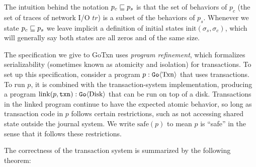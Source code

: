 The intuition behind the notation $p_{c} \sqsubseteq p_{s}$ is that the set of
behaviors of $p_{c}$ (the set of traces of network I/O $\textit{tr}$) is a subset of the
behaviors of $p_{s}$. Whenever we state $p_{c} \sqsubseteq p_{s}$ we leave implicit
a definition of initial states $\mathrm{init}(\sigma_{s}, \sigma_{c})$, which
will generally say both states are all zeros and of the same size.

The specification we give to GoTxn uses \emph{program refinement},
which formalizes serializability (sometimes known as atomicity and isolation) for transactions.
To set up this specification, consider a program $p : \mathtt{Go}\langle \mathrm{Txn} \rangle$ that
uses transactions.
To run $p$, it is combined with the transaction-system implementation, producing
a program $\mathrm{link}(p, \texttt{txn}) : \mathtt{Go}\langle \mathrm{Disk} \rangle$ that can be run on
top of a disk.
Transactions in the linked program continue to have the expected atomic
behavior, so long as transaction code in $p$ follows certain restrictions, such
as not accessing shared state outside the journal system.  We write
$\mathrm{safe}(p)$ to mean $p$ is ``safe'' in the sense that it follows these restrictions.

%

The correctness of the transaction system is summarized by the following theorem:


